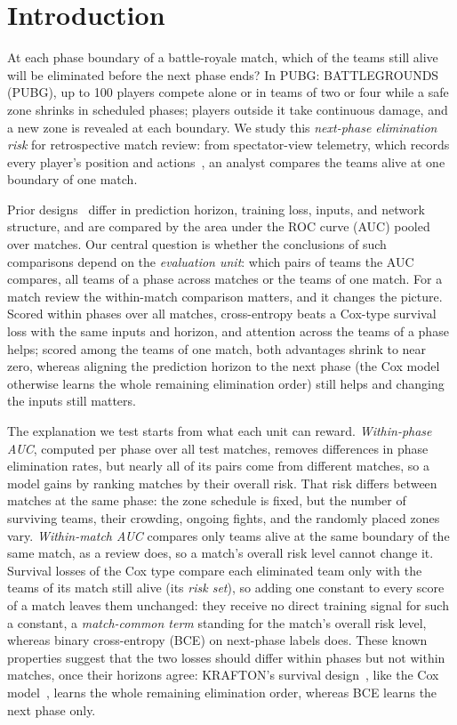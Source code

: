 \documentclass[sigconf,anonymous]{acmart}
\begin{document}
\section{Introduction}
\label{sec:introduction}
At each phase boundary of a battle-royale match, which of the teams still alive will be eliminated before the next phase ends? In PUBG: BATTLEGROUNDS (PUBG), up to 100 players compete alone or in teams of two or four while a safe zone shrinks in scheduled phases; players outside it take continuous damage, and a new zone is revealed at each boundary. We study this \emph{next-phase elimination risk} for retrospective match review: from spectator-view telemetry, which records every player's position and actions~\cite{PUBGAPI}, an analyst compares the teams alive at one boundary of one match.

Prior designs~\cite{Sagong25a,KRAFTON} differ in prediction horizon, training loss, inputs, and network structure, and are compared by the area under the ROC curve (AUC) pooled over matches. Our central question is whether the conclusions of such comparisons depend on the \emph{evaluation unit}: which pairs of teams the AUC compares, all teams of a phase across matches or the teams of one match. For a match review the within-match comparison matters, and it changes the picture. Scored within phases over all matches, cross-entropy beats a Cox-type survival loss with the same inputs and horizon, and attention across the teams of a phase helps; scored among the teams of one match, both advantages shrink to near zero, whereas aligning the prediction horizon to the next phase (the Cox model otherwise learns the whole remaining elimination order) still helps and changing the inputs still matters.

The explanation we test starts from what each unit can reward. \emph{Within-phase AUC}, computed per phase over all test matches, removes differences in phase elimination rates, but nearly all of its pairs come from different matches, so a model gains by ranking matches by their overall risk. That risk differs between matches at the same phase: the zone schedule is fixed, but the number of surviving teams, their crowding, ongoing fights, and the randomly placed zones vary. \emph{Within-match AUC} compares only teams alive at the same boundary of the same match, as a review does, so a match's overall risk level cannot change it. Survival losses of the Cox type compare each eliminated team only with the teams of its match still alive (its \emph{risk set}), so adding one constant to every score of a match leaves them unchanged: they receive no direct training signal for such a constant, a \emph{match-common term} standing for the match's overall risk level, whereas binary cross-entropy (BCE) on next-phase labels does. These known properties suggest that the two losses should differ within phases but not within matches, once their horizons agree: KRAFTON's survival design~\cite{KRAFTON}, like the Cox model~\cite{Cox72}, learns the whole remaining elimination order, whereas BCE learns the next phase only.
\end{document}
